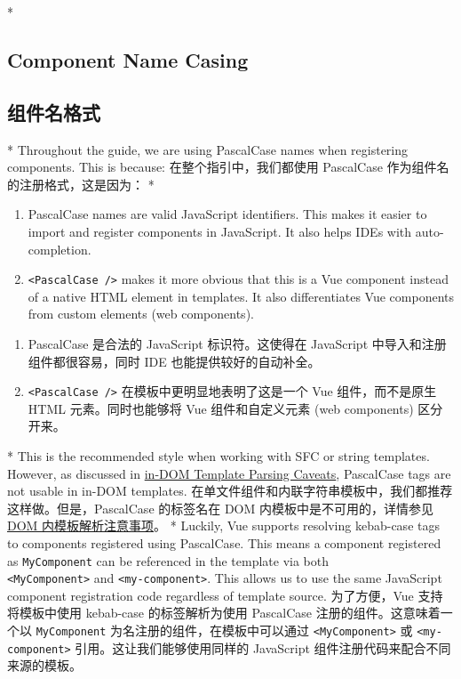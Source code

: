 \begin{paracol}{2}

\switchcolumn[0]*%
\subsection{Component Name Casing}
\switchcolumn
\subsection{组件名格式}
\switchcolumn[0]*%
Throughout the guide, we are using PascalCase names when registering
components. This is because:
\switchcolumn
在整个指引中，我们都使用 PascalCase 作为组件名的注册格式，这是因为：
\switchcolumn[0]*%
\begin{enumerate}
\item
    PascalCase names are valid JavaScript identifiers. This makes it
    easier to import and register components in JavaScript. It also helps
    IDEs with auto-completion.
\item
    \texttt{\textless{}PascalCase\ /\textgreater{}} makes it more obvious
    that this is a Vue component instead of a native HTML element in
    templates. It also differentiates Vue components from custom elements
    (web components).
\end{enumerate}
\switchcolumn
\begin{enumerate}
\item
    PascalCase 是合法的 JavaScript 标识符。这使得在 JavaScript
    中导入和注册组件都很容易，同时 IDE 也能提供较好的自动补全。
\item
    \texttt{\textless{}PascalCase\ /\textgreater{}}
    在模板中更明显地表明了这是一个 Vue 组件，而不是原生 HTML
    元素。同时也能够将 Vue 组件和自定义元素 (web components) 区分开来。
\end{enumerate}


\switchcolumn[0]*%
This is the recommended style when working with SFC or string templates.
However, as discussed in
\href{https://vuejs.org/guide/essentials/component-basics.html\#in-dom-template-parsing-caveats}{in-DOM
Template Parsing Caveats}, PascalCase tags are not usable in in-DOM
templates.
\switchcolumn
在单文件组件和内联字符串模板中，我们都推荐这样做。但是，PascalCase
的标签名在 DOM 内模板中是不可用的，详情参见
\href{https://cn.vuejs.org/guide/essentials/component-basics.html\#in-dom-template-parsing-caveats}{DOM
内模板解析注意事项}。
\switchcolumn[0]*%
Luckily, Vue supports resolving kebab-case tags to components registered
using PascalCase. This means a component registered as
\texttt{MyComponent} can be referenced in the template via both
\\ \texttt{\textless{}MyComponent\textgreater{}} and
\texttt{\textless{}my-component\textgreater{}}. This allows us to use
the same JavaScript component registration code regardless of template
source.
\switchcolumn
为了方便，Vue 支持将模板中使用 kebab-case 的标签解析为使用 PascalCase
注册的组件。这意味着一个以 \texttt{MyComponent}
为名注册的组件，在模板中可以通过
\texttt{\textless{}MyComponent\textgreater{}} 或
\texttt{\textless{}my-component\textgreater{}}
引用。这让我们能够使用同样的 JavaScript
组件注册代码来配合不同来源的模板。

\end{paracol}
